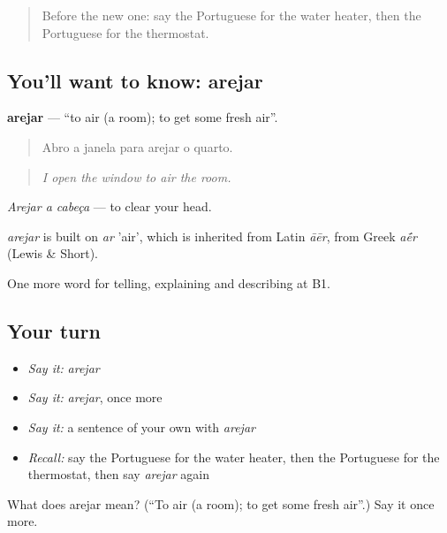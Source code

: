 \label{lesson:PT-C431-arejar}



\begin{quote}
Before the new one: say the Portuguese for the water heater, then the Portuguese for the thermostat.
\end{quote}

\subsection*{You'll want to know: arejar}
\textbf{arejar} — \textquotedblleft{}to air (a room); to get some fresh air\textquotedblright{}.

\begin{quote}
Abro a janela para arejar o quarto.
\end{quote}

\begin{quote}
\emph{I open the window to air the room.}
\end{quote}

\emph{Arejar a cabeça} — to clear your head.

\begin{cousinweb}
\emph{arejar} is built on \emph{ar} 'air', which is inherited from Latin \emph{āēr}, from Greek \emph{a\'{\={e}}r} (Lewis \& Short).
\end{cousinweb}

\begin{grammarlens}[title={What you've built}]
One more word for telling, explaining and describing at B1.
\end{grammarlens}

\subsection*{Your turn}
\begin{itemize}
\raggedright
  \item \emph{Say it:} \emph{arejar}
  \item \emph{Say it:} \emph{arejar}, once more
  \item \emph{Say it:} a sentence of your own with \emph{arejar}
  \item \emph{Recall:} say the Portuguese for the water heater, then the Portuguese for the thermostat, then say \emph{arejar} again
\end{itemize}

\begin{tcolorbox}[breakable,colback=teal!4,colframe=teal!35!black,title={Before you move on}]
What does arejar mean? (\textquotedblleft{}To air (a room); to get some fresh air\textquotedblright{}.) Say it once more.
\end{tcolorbox}
